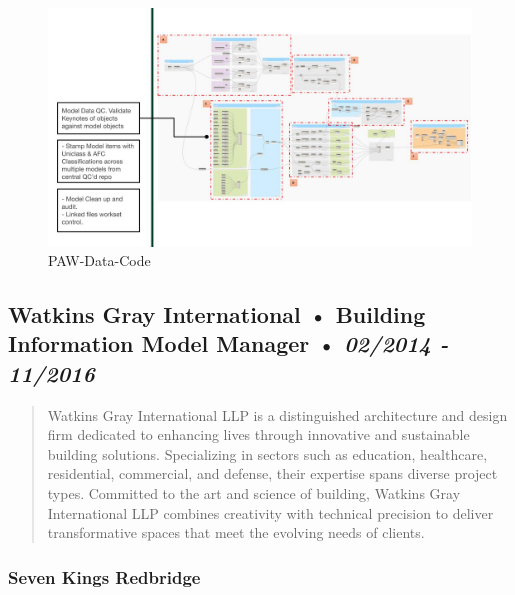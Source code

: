 \documentclass[
]{article}
\begin{document}
\begin{figure}[H]

{\centering \includegraphics{assets/PAW/2020-Portfolio-Google-Slides-dynamo2.jpg}

}

\caption{PAW-Data-Code}

\end{figure}%

\subsection{\texorpdfstring{Watkins Gray International • Building
Information Model Manager • \emph{02/2014 -
11/2016}}{Watkins Gray International • Building Information Model Manager • 02/2014 - 11/2016}}\label{watkins-gray-international-building-information-model-manager-022014---112016}

\begin{quote}
Watkins Gray International LLP is a distinguished architecture and
design firm dedicated to enhancing lives through innovative and
sustainable building solutions. Specializing in sectors such as
education, healthcare, residential, commercial, and defense, their
expertise spans diverse project types. Committed to the art and science
of building, Watkins Gray International LLP combines creativity with
technical precision to deliver transformative spaces that meet the
evolving needs of clients.
\end{quote}

\subsubsection{Seven Kings Redbridge}\label{seven-kings-redbridge}
\end{document}
